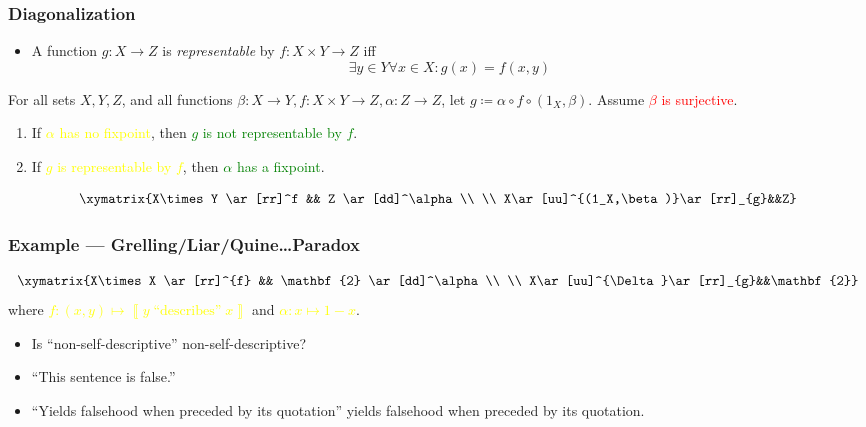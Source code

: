 \documentclass[UTF8,aspectratio=43,11pt,colorlinks,compress,openany]{beamer}%
\begin{document}
\begin{frame}\frametitle{Diagonalization}
	\begin{itemize}
		\item A function $g: X\to Z$ is \emph{representable} by $f: X\times Y\to Z$ iff
		\[\exists y\in Y\forall x\in X: g(x)=f(x,y)\]
	\end{itemize}
\setlength\abovedisplayskip{0pt}
\setlength\belowdisplayskip{0pt}
	\begin{theorem}
		For all sets $X, Y, Z$, and all functions $\beta: X\to Y, f: X\times Y\to Z, \alpha: Z\to Z$, let $g\coloneqq \alpha\circ f\circ(1_X,\beta)$. Assume \textcolor{red}{$\beta$ is surjective}. 
		\begin{enumerate}
			\item If \textcolor{yellow}{$\alpha$ has no fixpoint}, then \textcolor{green}{$g$ is not representable by $f$}.
			\item If \textcolor{yellow}{$g$ is representable by $f$}, then \textcolor{green}{$\alpha$ has a fixpoint}.
		\end{enumerate}
	\end{theorem}
	\[\xymatrix{X\times Y
	\ar[rr]^f && Z \ar[dd]^\alpha\\
	\\
	X\ar[uu]^{(1_X,\beta)}\ar[rr]_{g}&&Z}\]
\end{frame}

\begin{frame}\frametitle{Example --- Grelling/Liar/Quine\dots Paradox}
\setlength\abovedisplayskip{0pt}
\setlength\belowdisplayskip{0pt}
	\[\xymatrix{X\times X
		\ar[rr]^{f} && \mathbf{2} \ar[dd]^\alpha
		\\
		\\
		X\ar[uu]^{\Delta}\ar[rr]_{g}&&\mathbf{2}}\]
	where \textcolor{yellow}{$f: (x,y)\mapsto\left\llbracket y\;\mbox{``describes''}\;x\right\rrbracket$} and \textcolor{yellow}{$\alpha: x\mapsto 1-x$}.
	\begin{itemize}
		\item Is ``non-self-descriptive'' non-self-descriptive?
		\item ``This sentence is false.''
		\item ``Yields falsehood when preceded by its quotation'' yields falsehood when preceded by its quotation.
	\end{itemize}
\end{frame}
\end{document}
